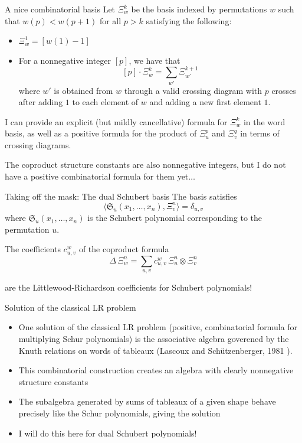 \documentclass[aspectratio=169]{beamer}
\newcommand{\Sch}[1]{\Xi_{#1}}
\begin{document}
\begin{frame}{A nice combinatorial basis}
Let $\Xi_w^k$ be the basis indexed by permutations $w$ such that $w(p) < w(p+1)$ for all $p>k$ satisfying the following:
\begin{itemize}
\item $\Xi_{w}^1 = [w(1) - 1]$
\item For a nonnegative integer $[p]$, we have that
$$[p]\cdot\Xi_w^k = \sum_{w'}\Xi_{w'}^{k+1}$$
where $w'$ is obtained from $w$ through a valid crossing diagram with $p$ crosses after adding $1$ to each element of $w$ and adding a new first element $1$. 
\end{itemize}

I can provide an explicit (but mildly cancellative) formula for $\Xi_w^k$ in the word basis, as well as a positive formula for the product of $\Xi_u^p$ and $\Xi_v^q$ in terms of crossing diagrams. 

The coproduct structure constants are also nonnegative integers, but I do not have a positive combinatorial formula for them yet$\ldots$
\end{frame}

\begin{frame}{Taking off the mask: The dual Schubert basis}
The basis satisfies
$$\langle \mathfrak{S}_{u}(x_1,\ldots,x_n), \Xi_{v}^{n} \rangle = \delta_{u,v}$$
where $\mathfrak{S}_{u}(x_1,\ldots,x_n)$ is the Schubert polynomial corresponding to the permutation $u$.

The coefficients $c_{u,v}^{w}$ of the coproduct formula
\[
\Delta\,\Sch{w}^{n} = \sum_{u,v} c_{u,v}^{w}\,\Sch{u}^{n}\otimes \Sch{v}^{n}
\]

are the Littlewood-Richardson coefficients for Schubert polynomials!

\end{frame}

\begin{frame}{Solution of the classical LR problem}
  \begin{itemize}
  \item One solution of the classical LR problem (positive, combinatorial formula for multiplying Schur polynomials) is the associative algebra goverened by the Knuth relations on words of tableaux (Lascoux and Sch\"utzenberger, 1981 \cite{lascoux1981monoide}).
  \item This combinatorial construction creates an algebra with clearly nonnegative structure constants
  \item The subalgebra generated by sums of tableaux of a given shape behave precisely like the Schur polynomials, giving the solution

  \item I will do this here for dual Schubert polynomials!
  \end{itemize}
\end{frame}
\end{document}
